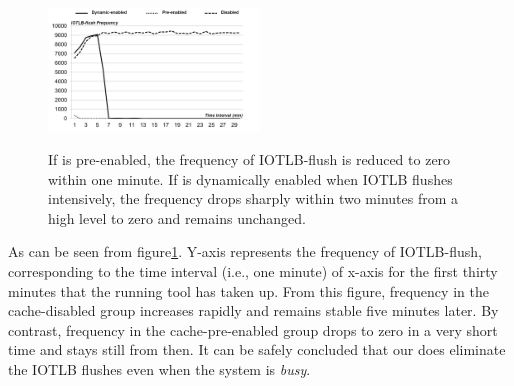 \begin{figure}[ht]
\centering
\includegraphics[width=0.5\textwidth]{image/micro/iotlbflush.png} \\
\caption{If \name is pre-enabled, the frequency of IOTLB-flush is reduced to zero within one minute. If \name is dynamically enabled when IOTLB flushes intensively, the frequency drops sharply within two minutes from a high level to zero and remains unchanged.}
\label{fig:iotlbflush}
\end{figure}

As can be seen from figure\ref{fig:iotlbflush}. Y-axis represents the frequency of IOTLB-flush, corresponding to the time interval (i.e., one minute) of x-axis for the first thirty minutes that the running tool has taken up. From this figure, frequency in the cache-disabled group increases rapidly and remains stable five minutes later. By contrast, frequency in the cache-pre-enabled group drops to zero in a very short time and stays still from then. It can be safely concluded that our \name does eliminate the IOTLB flushes even when the system is \emph{busy}.


